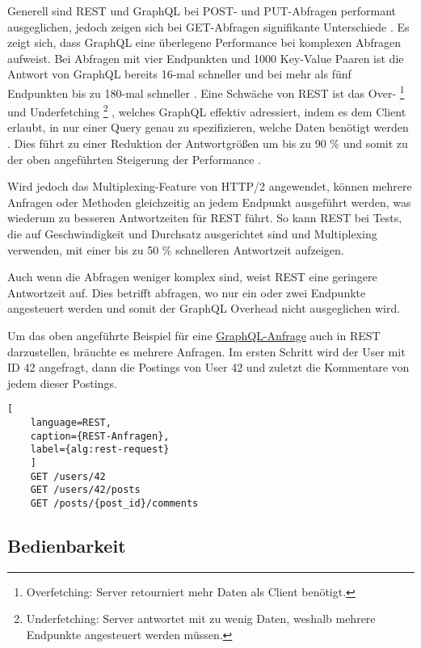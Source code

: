 \documentclass[draft,final]{vutinfth} %
\begin{document}
Generell sind REST und GraphQL bei POST- und PUT-Abfragen performant ausgeglichen, jedoch zeigen sich bei GET-Abfragen signifikante Unterschiede \cite{Vohra:2022:GraphVsRestImplementation}.
Es zeigt sich, dass GraphQL eine überlegene Performance bei komplexen Abfragen aufweist.
Bei Abfragen mit vier Endpunkten und 1000 Key-Value Paaren ist die Antwort von GraphQL bereits 16-mal schneller und bei mehr als fünf Endpunkten bis zu 180-mal schneller \cite{Quinamera:2023:GraphMappingStudy}.
Eine Schwäche von REST ist das Over-
\footnote{
	Overfetching: Server retourniert mehr Daten als Client benötigt.
}
und Underfetching
\footnote{
	Underfetching: Server antwortet mit zu wenig Daten, weshalb mehrere Endpunkte angesteuert werden müssen.
}
, welches GraphQL effektiv adressiert, indem es dem Client erlaubt, in nur einer Query genau zu spezifizieren, welche Daten benötigt werden \cite{Brito:2019:MigratingToGraphQL}. 
Dies führt zu einer Reduktion der Antwortgrößen um bis zu 90 \% und somit zu der oben angeführten Steigerung der Performance \cite{Brito:2019:MigratingToGraphQL}.

Wird jedoch das Multiplexing-Feature von HTTP/2 angewendet, können mehrere Anfragen oder Methoden gleichzeitig an jedem Endpunkt ausgeführt werden, was wiederum zu besseren Antwortzeiten für REST führt.
So kann REST bei Tests, die auf Geschwindigkeit und Durchsatz ausgerichtet sind und Multiplexing verwenden, mit einer bis zu 50 \% schnelleren Antwortzeit aufzeigen. \cite{Lawi:2021:GraphVsRestPerformance}

Auch wenn die Abfragen weniger komplex sind, weist REST eine geringere Antwortzeit auf. 
Dies betrifft abfragen, wo nur ein oder zwei Endpunkte angesteuert werden und somit der GraphQL Overhead nicht ausgeglichen wird. \cite{Quinamera:2023:GraphMappingStudy}

Um das oben angeführte Beispiel für eine \hyperref[alg:graphql-request]{GraphQL-Anfrage} auch in REST darzustellen, bräuchte es mehrere Anfragen. Im ersten Schritt wird der User mit ID 42 angefragt, dann die Postings von User 42 und zuletzt die Kommentare von jedem dieser Postings.

\begin{lstlisting}[
	language=REST, 
	caption={REST-Anfragen}, 
	label={alg:rest-request}
	]
	GET /users/42
	GET /users/42/posts
	GET /posts/{post_id}/comments
\end{lstlisting}


\subsection{Bedienbarkeit}
\end{document}
